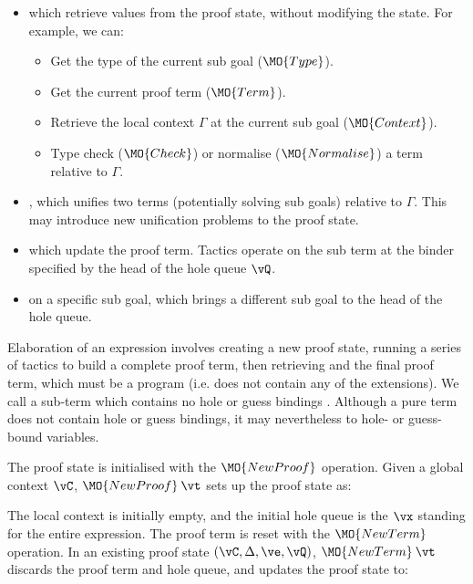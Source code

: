\begin{itemize}
\item {} which retrieve values from the proof state, without modifying
the state. For example, we can:
\begin{itemize}
\item Get the type of the current sub goal ($\MO{Type}$).
\item Get the current proof term ($\MO{Term}$).
\item Retrieve the local context $\Gamma$ at the current sub goal
($\MO{Context}$).
\item Type check ($\MO{Check}$) or normalise ($\MO{Normalise}$) a term relative
to $\Gamma$.
\end{itemize}
\item {}, which unifies two terms (potentially solving sub
goals) relative to $\Gamma$. This may introduce new unification problems
to the proof state.
\item {} which update the proof term. Tactics operate on the sub term
at the binder specified by the head of the hole queue $\vQ$.
\item {} on a specific sub goal, which brings a different sub goal to the
head of the hole queue.
\end{itemize}

Elaboration of an \Idris{} expression involves creating a new proof state,
running a series of tactics to build a complete proof term, then retrieving and
 the final proof term, which must be a \TT{} program (i.e.
does not contain any of the \TTdev{} extensions). We call a sub-term which
contains no hole or guess bindings . Although a pure term does not
contain hole or guess bindings, it may nevertheless  to hole- or
guess-bound variables.

The proof state is initialised with the $\MO{NewProof}$ operation. Given a
global context $\vC$, $\MO{NewProof}\:\vt$ sets up the proof state as:

\DM{
(\vC, \cdot, \hole{\vx}{\vt}\SC\vx, \langle\rangle, \langle\vx\rangle)
}

The local context is initially empty, and the initial hole queue is the $\vx$ standing for
the entire expression. The proof term is reset with the $\MO{NewTerm}$ operation.
In an existing proof state $(\vC, \Delta, \ve, \vQ)$,
$\MO{NewTerm}\:\vt$ discards the proof term and hole queue, and
updates the proof state to:

